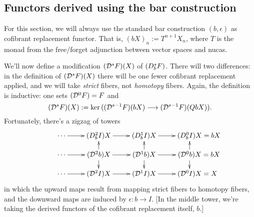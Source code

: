 \documentclass[10pt]{article}
\begin{document}
\begin{convergence}

\subsection{Functors derived using the bar construction}
For this section, we will always use the standard bar construction $(b,\epsilon)$ as cofibrant replacement functor. That is, $(bX)_n:=T^{n+1}X_n$, where $T$ is the monad from the free/forget adjunction between vector spaces and nucas.

We'll now define a modification $(\mathcal{D}^{\smash{s}}F)(X)$ of $(D^{\smash{s}}_{\smash{b}}F)$. There will two differences: in the definition of $(\mathcal{D}^{\smash{s}}F)(X)$ there will be one fewer cofibrant replacement applied, and we will take \emph{strict} fibers, not \emph{homotopy} fibers. Again, the definition is inductive: one sets $(\mathcal{D}^{\smash{0}}F)=F$ and
\[(\mathcal{D}^{\smash{s}}F)(X):=\textup{ker}\,((\mathcal{D}^{\smash{s-1}}F)(bX)\longrightarrow (\mathcal{D}^{\smash{s-1}}F)(QbX)).\]
Fortunately, there's a zigzag of towers
\[\xymatrix@R=4mm{
\cdots 
\ar[r]
&%
(\dupdown{2}{b}I)X
\ar[r]
&%
(\dupdown{1}{b}I)X
\ar[r]&%
(\dupdown{0}{b}I)X\makebox[0pt][l]{$\mbox{}=bX$}\\
\cdots 
\ar[r]
&%
(\caldup{2}b)X
\ar[u]_-{}
\ar[d]^-{}
\ar[r]
&%
(\caldup{1}b)X
\ar[u]_-{}
\ar[d]^-{}
\ar[r]&%
(\caldup{0}b)X\makebox[0pt][l]{$\mbox{}=bX$}
\ar[u]_-{}
\ar[d]^-{}\\
\cdots 
\ar[r]
&%
(\caldup{2}I)X
\ar[r]
&%
(\caldup{1}I)X
\ar[r]&%
(\caldup{0}I)X\makebox[0pt][l]{$\mbox{}=X$}
}\]
in which the upward maps result from mapping strict fibers to homotopy fibers, and the downward maps are induced by $\epsilon:b\to I$. [In the middle tower, we're taking the derived functors of the cofibrant replacement itself, $b$.]
%


\end{convergence}
\end{document}
